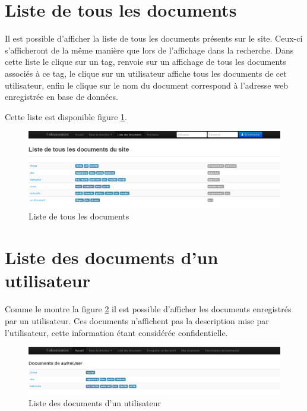 \documentclass[12pt,a4paper,openany]{book}
\begin{document}
	\section{Liste de tous les documents}
	Il est possible d'afficher la liste de tous les documents présents sur le site. Ceux-ci s'afficheront de la même manière que
	lors de l'affichage dans la recherche. Dans cette liste le clique sur un tag, renvoie sur un affichage de tous les documents
	associés à ce tag, le clique sur un utilisateur affiche tous les documents de cet utilisateur, enfin le clique sur le nom du
	document correspond à l'adresse web enregistrée en base de données.

	Cette liste est disponible figure \ref{fig:listeDocs}.
	\begin{figure}[H]
		\centering
		\includegraphics[width=18cm]{screens/documents.png} 
		\caption{Liste de tous les documents} 
		\label{fig:listeDocs}
	\end{figure}

	\section{Liste des documents d'un utilisateur}\label{docUser}
	Comme le montre la figure \ref{fig:docUser} il est possible d'afficher les documents enregistrés par un utilisateur. Ces
	documents n'affichent pas la description mise par l'utilisateur, cette information étant considérée confidentielle.
	\begin{figure}[H]
		\centering
		\includegraphics[width=18cm]{screens/documentUser.png} 
		\caption{Liste des documents d'un utilisateur}
		\label{fig:docUser}
	\end{figure}
\end{document}
